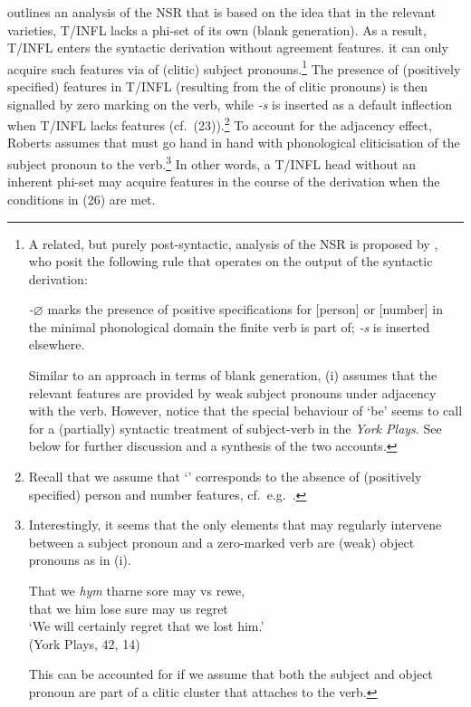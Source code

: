 \documentclass[output=paper]{langsci/langscibook}
\begin{document}
\textcite{Roberts:2010} outlines an analysis of the \gls{NSR} that is based on
the idea that in the relevant varieties, T/INFL lacks a phi-set of its own
(blank generation). As a result, T/INFL enters the syntactic derivation without
agreement features. it can only acquire such features via  of
(clitic) subject pronouns.\footnote{A related, but purely
    post-syntactic, analysis of the \gls{NSR} is
    proposed by \citealp{TripsFuss:2010}, who posit the following
     rule that operates on the output of the syntactic
    derivation:

    \begin{exe}
         \emph{-$\varnothing$} marks the presence of positive specifications for [person] or [number] in the minimal phonological domain the finite verb is part of; \emph{-s} is inserted elsewhere.
    \end{exe}
    Similar to an approach in terms of blank generation, (i) assumes that the
    relevant  features are provided by weak subject pronouns
    under adjacency with the verb. However, notice that the special behaviour
    of `be' seems to call for a (partially) syntactic treatment of subject-verb
     in the \emph{York Plays}. See below for further discussion
    and a synthesis of the two accounts.} The presence of (positively
    specified)  features in T/INFL (resulting from the
     of clitic pronouns) is then signalled by zero marking
    on the verb, while \emph{-s} is inserted as a default inflection when
    T/INFL lacks  features (cf.\ (23)).\footnote{Recall that we
        assume that `\Tsg{}' corresponds to the absence of (positively
        specified) person and number features, cf.\ e.g.\
        \cite{Harleyritter:2002}.\label{fn:10.38}} To account for the adjacency effect, Roberts assumes that  must go hand in hand with phonological cliticisation of the subject pronoun to the verb.\footnote{Interestingly, it seems that the only elements that may regularly intervene between a subject pronoun and a zero-marked verb are (weak) object pronouns as in (i).

    \begin{exe}
        \gll That we \textit{hym} tharne sore may vs rewe,\\
        that we him lose sure may us regret\\
        \glt `We will certainly regret that we lost him.'\\
        (York Plays, 42, 14)
    \end{exe}
This can be accounted for if we assume that both the subject and object pronoun
are part of a clitic cluster that attaches to the verb.} In other words, a
T/INFL head without an inherent phi-set may acquire \isi{agreement} features in
the course of the derivation when the conditions in (26) are met.
\end{document}
